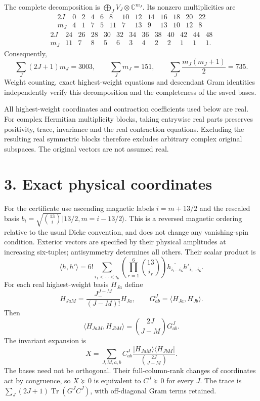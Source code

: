 \documentclass[11pt]{article}
\newcommand{\Tr}{\operatorname{Tr}}
\begin{document}
The complete decomposition is $\bigoplus_JV_J\otimes\mathbb C^{m_J}$. Its nonzero multiplicities are
\[
\begin{array}{c|rrrrrrrrrrrr}
2J&0&2&4&6&8&10&12&14&16&18&20&22\\\hline
m_J&4&1&7&5&11&7&13&9&13&10&12&8
\end{array}
\]
\[
\begin{array}{c|rrrrrrrrrrrr}
2J&24&26&28&30&32&34&36&38&40&42&44&48\\\hline
m_J&11&7&8&5&6&3&4&2&2&1&1&1.
\end{array}
\]
Consequently,
\[
\sum_J(2J+1)m_J=3003,\qquad
\sum_Jm_J=151,\qquad
\sum_J\frac{m_J(m_J+1)}2=735.
\]
Weight counting, exact highest-weight equations and descendant Gram identities independently verify this decomposition and the completeness of the saved bases.

All highest-weight coordinates and contraction coefficients used below are real. For complex Hermitian multiplicity blocks, taking entrywise real parts preserves positivity, trace, invariance and the real contraction equations. Excluding the resulting real symmetric blocks therefore excludes arbitrary complex original subspaces. The original vectors are not assumed real.

\section*{3. Exact physical coordinates}
For the certificate use ascending magnetic labels $i=m+13/2$ and the rescaled basis
$b_i=\sqrt{\binom{13}{i}}|13/2,m=i-13/2\rangle$. This is a reversed magnetic ordering relative to the usual Dicke convention, and does not change any vanishing-spin condition. Exterior vectors are specified by their physical amplitudes at increasing six-tuples; antisymmetry determines all others. Their scalar product is
\[
\langle h,h'\rangle=6!\sum_{i_1<\cdots<i_6}
\left(\prod_{r=1}^6\binom{13}{i_r}\right)
\overline{h_{i_1\ldots i_6}}h'_{i_1\ldots i_6}.
\]
For each real highest-weight basis $H_{Ja}$ define
\[
H_{JaM}=\frac{J_-^{J-M}}{(J-M)!}H_{Ja},\qquad
G^J_{ab}=\langle H_{Ja},H_{Jb}\rangle.
\]
Then
\[
\langle H_{JaM},H_{JbM}\rangle=\binom{2J}{J-M}G^J_{ab}.
\]
The invariant expansion is
\[
X=\sum_{J,M,a,b}C^J_{ab}
\frac{|H_{JaM}\rangle\langle H_{JbM}|}{\binom{2J}{J-M}}.
\]
The bases need not be orthogonal. Their full-column-rank changes of coordinates act by congruence, so $X\succeq0$ is equivalent to $C^J\succeq0$ for every $J$. The trace is $\sum_J(2J+1)\Tr(G^JC^J)$, with off-diagonal Gram terms retained.
\end{document}
